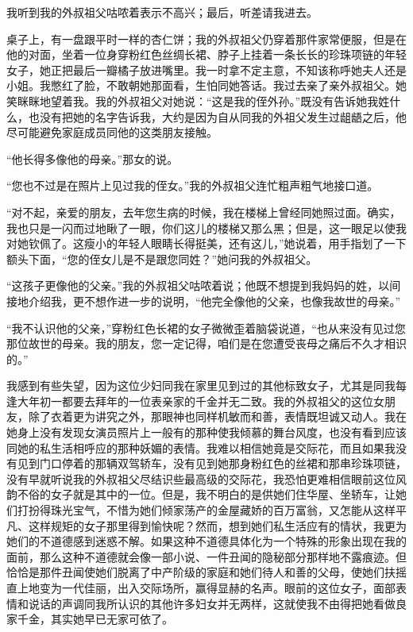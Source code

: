 \par 我听到我的外叔祖父咕哝着表示不高兴；最后，听差请我进去。
\par 桌子上，有一盘跟平时一样的杏仁饼；我的外叔祖父仍穿着那件家常便服，但是在他的对面，坐着一位身穿粉红色丝绸长裙、脖子上挂着一条长长的珍珠项链的年轻女子，她正把最后一瓣橘子放进嘴里。我一时拿不定主意，不知该称呼她夫人还是小姐。我憋红了脸，不敢朝她那面看，生怕同她答话。我过去亲了亲外叔祖父。她笑眯眯地望着我。我的外叔祖父对她说：“这是我的侄外孙。”既没有告诉她我姓什么，也没有把她的名字告诉我，大约是因为自从同我的外祖父发生过龃龉之后，他尽可能避免家庭成员同他的这类朋友接触。
\par “他长得多像他的母亲。”那女的说。
\par “您也不过是在照片上见过我的侄女。”我的外叔祖父连忙粗声粗气地接口道。
\par “对不起，亲爱的朋友，去年您生病的时候，我在楼梯上曾经同她照过面。确实，我也只是一闪而过地瞅了一眼，你们这儿的楼梯又那么黑；但是，这一眼足以使我对她钦佩了。这瘦小的年轻人眼睛长得挺美，还有这儿，”她说着，用手指划了一下额头下面，“您的侄女儿是不是跟您同姓？”她问我的外叔祖父。
\par “这孩子更像他的父亲。”我的外叔祖父咕哝着说；他既不想提到我妈妈的姓，以间接地介绍我，更不想作进一步的说明，“他完全像他的父亲，也像我故世的母亲。”
\par “我不认识他的父亲，”穿粉红色长裙的女子微微歪着脑袋说道，“也从来没有见过您那位故世的母亲。我的朋友，您一定记得，咱们是在您遭受丧母之痛后不久才相识的。”
\par 我感到有些失望，因为这位少妇同我在家里见到过的其他标致女子，尤其是同我每逢大年初一都要去拜年的一位表亲家的千金并无二致。我的外叔祖父的这位女朋友，除了衣着更为讲究之外，那眼神也同样机敏而和善，表情既坦诚又动人。我在她身上没有发现女演员照片上一般有的那种使我倾慕的舞台风度，也没有看到应该同她的私生活相呼应的那种妖媚的表情。我难以相信她竟是交际花，而且如果我没有见到门口停着的那辆双驾轿车，没有见到她那身粉红色的丝裙和那串珍珠项链，没有早就听说我的外叔祖父尽结识些最高级的交际花，我恐怕更难相信眼前这位风韵不俗的女子就是其中的一位。但是，我不明白的是供她们住华屋、坐轿车，让她们打扮得珠光宝气，不惜为她们倾家荡产的金屋藏娇的百万富翁，又怎能从这样平凡、这样规矩的女子那里得到愉快呢？然而，想到她们私生活应有的情状，我更为她们的不道德感到迷惑不解。如果这种不道德具体化为一个特殊的形象出现在我的面前，那么这种不道德就会像一部小说、一件丑闻的隐秘部分那样地不露痕迹。但恰恰是那件丑闻使她们脱离了中产阶级的家庭和她们待人和善的父母，使她们扶摇直上地变为一代佳丽，出入交际场所，赢得显赫的名声。眼前的这位女子，面部表情和说话的声调同我所认识的其他许多妇女并无两样，这就使我不由得把她看做良家千金，其实她早已无家可依了。

